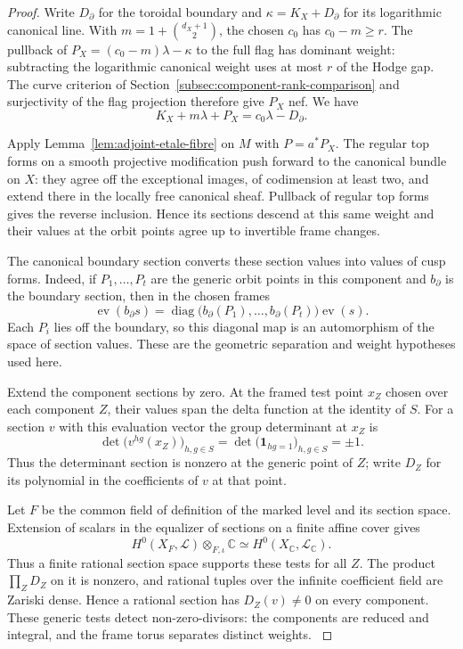 \begin{proof}
Write \(D_\partial\) for the toroidal boundary and
\(\kappa=K_X+D_\partial\) for its logarithmic canonical line. With
\(m=1+\binom{d_X+1}{2}\), the chosen \(c_0\) has \(c_0-m\ge r\).
The pullback of \(P_X=(c_0-m)\lambda-\kappa\) to the full flag
has dominant weight: subtracting the logarithmic canonical weight
uses at most \(r\) of the Hodge gap. The curve criterion of
Section~\ref{subsec:component-rank-comparison} and surjectivity of
the flag projection therefore give \(P_X\) nef. We have
\[
 K_X+m\lambda+P_X=c_0\lambda-D_\partial.
\]

Apply Lemma~\ref{lem:adjoint-etale-fibre} on \(M\) with \(P=a^*P_X\).
The regular top forms on a smooth projective modification push
forward to the canonical bundle on \(X\): they agree off the
exceptional images, of codimension at least two, and extend there
in the locally free canonical sheaf. Pullback of regular top forms
gives the reverse inclusion. Hence its sections descend at this
same weight and their values at the orbit points agree up to
invertible frame changes.

The canonical boundary section converts these section values into values of cusp forms.
Indeed, if \(P_1,\ldots,P_t\) are the generic orbit points in
this component and \(b_\partial\) is the boundary section, then in
the chosen frames
\[
 \operatorname{ev}(b_\partial s)
   =\operatorname{diag}\bigl(b_\partial(P_1),\ldots,b_\partial(P_t)\bigr)
                        \operatorname{ev}(s).
\]
Each \(P_i\) lies off the boundary, so this diagonal map is an automorphism of the space of section values. These are the
geometric separation and weight hypotheses used here.
\label{cor:covolume-component-transfer-13}


Extend the component sections by zero. At the framed test point
\(x_Z\) chosen over each component \(Z\), their values span the
delta function at the identity of \(S\). For a section \(v\)
with this evaluation vector the group determinant at \(x_Z\) is
\[
 \det\big(v^{hg}(x_Z)\big)_{h,g\in S}
                =\det\big(\mathbf1_{hg=1}\big)_{h,g\in S}=\pm1 .
\]
Thus the determinant section is nonzero at the generic point
of \(Z\); write \(D_Z\) for its polynomial in the coefficients
of \(v\) at that point.

Let \(F\) be the common field of definition of the marked level and
its section space. Extension of scalars in the equalizer of sections
on a finite affine cover gives
\[
 H^0(X_F,\mathcal L)\otimes_{F,\iota}\mathbb C
     \simeq H^0(X_{\mathbb C},\mathcal L_{\mathbb C}).
\]
Thus a finite rational section space supports these tests for all
\(Z\). The product \(\prod_Z D_Z\) on it is nonzero, and
rational tuples over the infinite coefficient field are Zariski
dense. Hence a rational section has \(D_Z(v)\ne0\) on every
component. These generic tests detect non-zero-divisors: the
components are reduced and integral, and the frame torus
separates distinct weights. \label{cor:covolume-component-transfer-14}


\end{proof}
